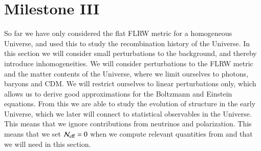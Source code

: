 \section{Milestone III}\label{sec:M3}
So far we have only considered the flat FLRW metric for a homogeneous Universe, and used this to study the recombination history of the Universe. In this section we will consider small perturbations to the background, and thereby introduce inhomogeneities. We will consider perturbations to the FLRW metric and the matter contents of the Universe, where we limit ourselves to photons, baryons and CDM. We will restrict ourselves to linear perturbations only, which allows us to derive good approximations for the Boltzmann and Einstein equations. From this we are able to study the evolution of structure in the early Universe, which we later will connect to statistical observables in the Universe. This means that we ignore contributions from neutrinos and polarization. This means that we set $\mathcal{N}_\mathrm{eff}=0$ when we compute relevant quantities from  and  that we will need in this section.    







 